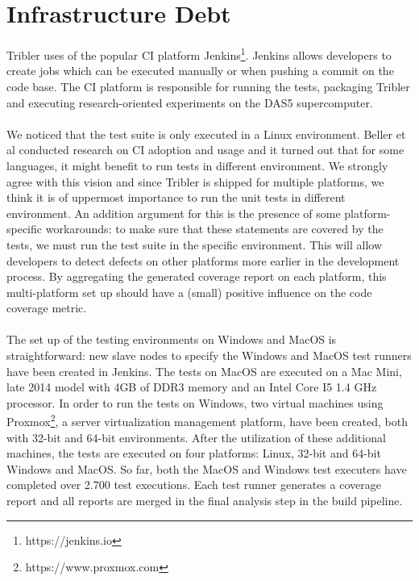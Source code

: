 \section{Infrastructure Debt}
Tribler uses of the popular CI platform Jenkins\footnote{https://jenkins.io}. Jenkins allows developers to create jobs which can be executed manually or when pushing a commit on the code base. The CI platform is responsible for running the tests, packaging Tribler and executing research-oriented experiments on the DAS5 supercomputer.\\\\
We noticed that the test suite is only executed in a Linux environment. Beller et al\cite{beller2016oops} conducted research on CI adoption and usage and it turned out that for some languages, it might benefit to run tests in different environment. We strongly agree with this vision and since Tribler is shipped for multiple platforms, we think it is of uppermost importance to run the unit tests in different environment. An addition argument for this is the presence of some platform-specific workarounds: to make sure that these statements are covered by the tests, we must run the test suite in the specific environment. This will allow developers to detect defects on other platforms more earlier in the development process. By aggregating the generated coverage report on each platform, this multi-platform set up should have a (small) positive influence on the code coverage metric.\\\\
The set up of the testing environments on Windows and MacOS is straightforward: new slave nodes to specify the Windows and MacOS test runners have been created in Jenkins. The tests on MacOS are executed on a Mac Mini, late 2014 model with 4GB of DDR3 memory and an Intel Core I5 1.4 GHz processor. In order to run the tests on Windows, two virtual machines using Proxmox\footnote{https://www.proxmox.com}, a server virtualization management platform, have been created, both with 32-bit and 64-bit environments. After the utilization of these additional machines, the tests are executed on four platforms: Linux, 32-bit and 64-bit Windows and MacOS. So far, both the MacOS and Windows test executers have completed over 2.700 test executions. Each test runner generates a coverage report and all reports are merged in the final analysis step in the build pipeline.

